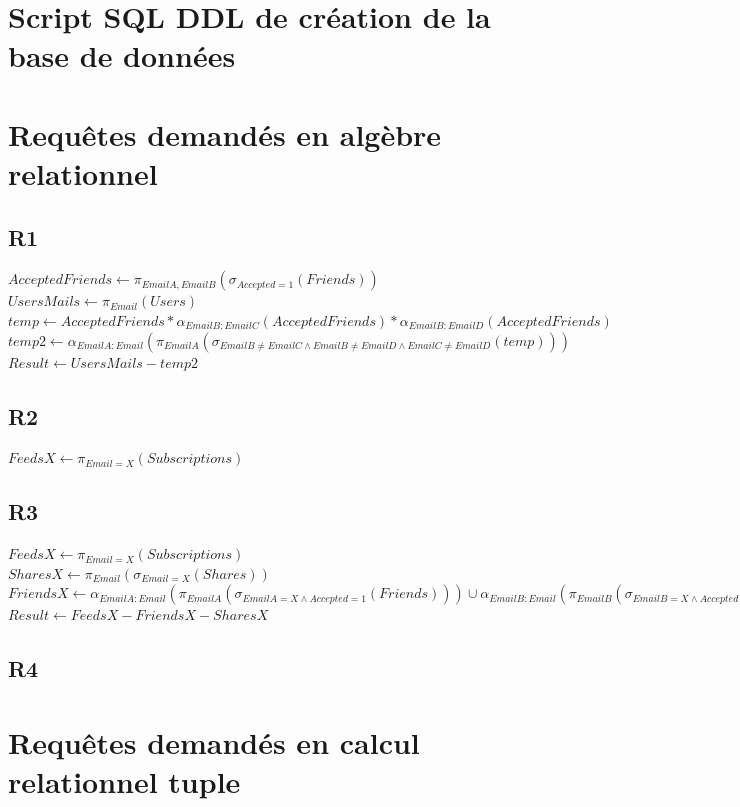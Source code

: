 \documentclass[11pt]{article}
\begin{document}
\section{Script SQL DDL de création de la base de données}

\section{Requêtes demandés en algèbre relationnel}
\subsection{R1}
\noindent $AcceptedFriends \longleftarrow \pi_{EmailA, EmailB}(\sigma_{Accepted = 1}(Friends))$ \\
$UsersMails \longleftarrow \pi_{Email}(Users)$ \\
$temp \longleftarrow AcceptedFriends \ast \alpha_{EmailB : EmailC}(AcceptedFriends) \ast \alpha_{EmailB : EmailD}(AcceptedFriends) $ \\
$temp2 \longleftarrow \alpha_{EmailA : Email}(\pi_{EmailA}(\sigma_{EmailB \neq EmailC \wedge EmailB \neq EmailD \wedge EmailC \neq EmailD}(temp))) $ \\
$Result \longleftarrow UsersMails - temp2 $
\subsection{R2}
\noindent $FeedsX \longleftarrow \pi_{Email = X}(Subscriptions) $ \\

\subsection{R3}
\noindent $FeedsX \longleftarrow \pi_{Email = X}(Subscriptions) $ \\
$SharesX \longleftarrow \pi_{Email}(\sigma_{Email = X}(Shares))$ \\
$FriendsX \longleftarrow \alpha_{EmailA : Email}(\pi_{EmailA}(\sigma_{EmailA = X \wedge Accepted = 1}(Friends))) \cup \alpha_{EmailB : Email} (\pi_{EmailB}(\sigma_{EmailB = X \wedge Accepted = 1}(Friends)))$ \\
$Result \longleftarrow FeedsX - FriendsX - SharesX$
\subsection{R4}


\section{Requêtes demandés en calcul relationnel tuple}
\end{document}
